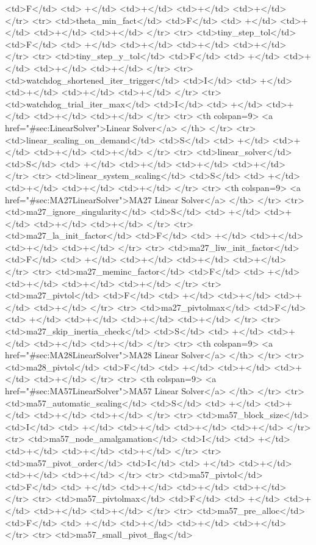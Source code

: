 {{<td>F</td>
<td> +</td>
<td>+</td>
<td>+</td>
<td>+</td>
</tr>
<tr>
<td>theta_min_fact</td>
<td>F</td>
<td> +</td>
<td>+</td>
<td>+</td>
<td>+</td>
</tr>
<tr>
<td>tiny_step_tol</td>
<td>F</td>
<td> +</td>
<td>+</td>
<td>+</td>
<td>+</td>
</tr>
<tr>
<td>tiny_step_y_tol</td>
<td>F</td>
<td> +</td>
<td>+</td>
<td>+</td>
<td>+</td>
</tr>
<tr>
<td>watchdog_shortened_iter_trigger</td>
<td>I</td>
<td> +</td>
<td>+</td>
<td>+</td>
<td>+</td>
</tr>
<tr>
<td>watchdog_trial_iter_max</td>
<td>I</td>
<td> +</td>
<td>+</td>
<td>+</td>
<td>+</td>
</tr>
<tr>   <th colspan=9> <a href="#sec:LinearSolver">Linear Solver</a> </th>
</tr>
<tr>
<td>linear_scaling_on_demand</td>
<td>S</td>
<td> +</td>
<td>+</td>
<td>+</td>
<td>+</td>
</tr>
<tr>
<td>linear_solver</td>
<td>S</td>
<td> +</td>
<td>+</td>
<td>+</td>
<td>+</td>
</tr>
<tr>
<td>linear_system_scaling</td>
<td>S</td>
<td> +</td>
<td>+</td>
<td>+</td>
<td>+</td>
</tr>
<tr>   <th colspan=9> <a href="#sec:MA27LinearSolver">MA27 Linear Solver</a> </th>
</tr>
<tr>
<td>ma27_ignore_singularity</td>
<td>S</td>
<td> +</td>
<td>+</td>
<td>+</td>
<td>+</td>
</tr>
<tr>
<td>ma27_la_init_factor</td>
<td>F</td>
<td> +</td>
<td>+</td>
<td>+</td>
<td>+</td>
</tr>
<tr>
<td>ma27_liw_init_factor</td>
<td>F</td>
<td> +</td>
<td>+</td>
<td>+</td>
<td>+</td>
</tr>
<tr>
<td>ma27_meminc_factor</td>
<td>F</td>
<td> +</td>
<td>+</td>
<td>+</td>
<td>+</td>
</tr>
<tr>
<td>ma27_pivtol</td>
<td>F</td>
<td> +</td>
<td>+</td>
<td>+</td>
<td>+</td>
</tr>
<tr>
<td>ma27_pivtolmax</td>
<td>F</td>
<td> +</td>
<td>+</td>
<td>+</td>
<td>+</td>
</tr>
<tr>
<td>ma27_skip_inertia_check</td>
<td>S</td>
<td> +</td>
<td>+</td>
<td>+</td>
<td>+</td>
</tr>
<tr>   <th colspan=9> <a href="#sec:MA28LinearSolver">MA28 Linear Solver</a> </th>
</tr>
<tr>
<td>ma28_pivtol</td>
<td>F</td>
<td> +</td>
<td>+</td>
<td>+</td>
<td>+</td>
</tr>
<tr>   <th colspan=9> <a href="#sec:MA57LinearSolver">MA57 Linear Solver</a> </th>
</tr>
<tr>
<td>ma57_automatic_scaling</td>
<td>S</td>
<td> +</td>
<td>+</td>
<td>+</td>
<td>+</td>
</tr>
<tr>
<td>ma57_block_size</td>
<td>I</td>
<td> +</td>
<td>+</td>
<td>+</td>
<td>+</td>
</tr>
<tr>
<td>ma57_node_amalgamation</td>
<td>I</td>
<td> +</td>
<td>+</td>
<td>+</td>
<td>+</td>
</tr>
<tr>
<td>ma57_pivot_order</td>
<td>I</td>
<td> +</td>
<td>+</td>
<td>+</td>
<td>+</td>
</tr>
<tr>
<td>ma57_pivtol</td>
<td>F</td>
<td> +</td>
<td>+</td>
<td>+</td>
<td>+</td>
</tr>
<tr>
<td>ma57_pivtolmax</td>
<td>F</td>
<td> +</td>
<td>+</td>
<td>+</td>
<td>+</td>
</tr>
<tr>
<td>ma57_pre_alloc</td>
<td>F</td>
<td> +</td>
<td>+</td>
<td>+</td>
<td>+</td>
</tr>
<tr>
<td>ma57_small_pivot_flag</td>
}}
